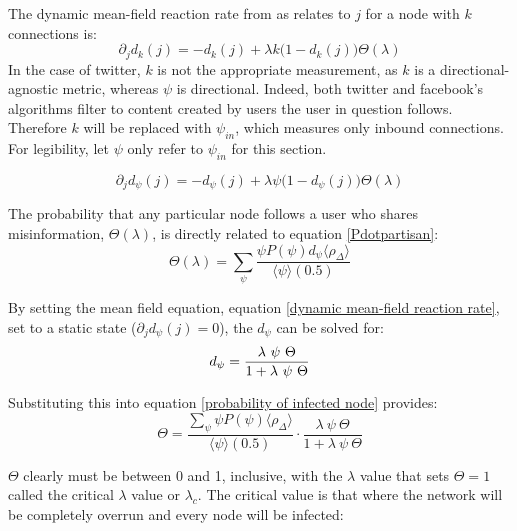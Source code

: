 \documentclass[NETN,manuscript]{stjour-new}
\begin{document}
The dynamic mean-field reaction rate from \citep{marro2005nonequilibrium} as relates to $j$ for a node with $k$ connections is: 
\begin{equation}
\label{dynamic mean-field reaction rate}
    \partial_jd_k(j) = - d_k(j) + \lambda k \big(1 - d_k(j)\big)\Theta(\lambda)
\end{equation}
In the case of twitter, $k$ is not the appropriate measurement, as $k$ is a directional-agnostic metric, whereas $\psi$ is directional. Indeed, both twitter and facebook's algorithms filter to content created by users the user in question follows. Therefore $k$ will be replaced with $\psi_{in}$, which measures only inbound connections. For legibility, let $\psi$ only refer to $\psi_{in}$ for this section.

\begin{equation}
\label{dynamic mean-field reaction rate}
    \partial_jd_{\psi}(j) = - d_{\psi}(j) + \lambda \psi \big(1 - d_{\psi}(j)\big)\Theta(\lambda)
\end{equation}

The probability that any particular node follows a user who shares misinformation, $\Theta(\lambda)$, is directly related to equation \ref{Pdotpartisan}:
\begin{equation}
\label{probability of infected node}
    \Theta(\lambda) = \sum_{\psi} \frac{\psi P(\psi)d_{\psi}\langle\rho_{\Delta}\rangle}{\langle \psi \rangle (0.5)}
\end{equation}

By setting the mean field equation, equation \ref{dynamic mean-field reaction rate}, set to a static state ($\partial_jd_{\psi}(j) = 0$), the $d_{\psi}$ can be solved for:
\begin{equation}
\label{static d_{\psi}}
    d_{\psi} = \frac{\lambda \ \psi \ \Theta}{1 + \lambda \ \psi \ \Theta}
\end{equation}

Substituting this into equation \ref{probability of infected node} provides:
\begin{equation}
    \Theta =  \frac{\sum_{\psi} \psi P(\psi)\langle\rho_{\Delta}\rangle}{\langle \psi \rangle(0.5)}\cdot \frac{\lambda \ \psi \ \Theta}{1 + \lambda \ \psi \ \Theta}
\end{equation}

$\Theta$ clearly must be between 0 and 1, inclusive, with the $\lambda$ value that sets $\Theta = 1$ called the critical $\lambda$ value or $\lambda_c$. The critical value is that where the network will be completely overrun and every node will be infected: 
\end{document}
